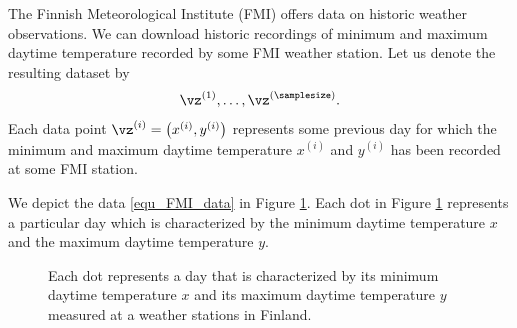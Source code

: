 \documentclass[12pt]{report}
\begin{document}
The Finnish Meteorological Institute (FMI) offers data on historic weather 
observations. We can download historic recordings of minimum and 
maximum daytime temperature recorded by some FMI weather station. 
Let us denote the resulting dataset by 
\begin{equation}
\label{equ_FMI_data}
\vz^{(1)},\ldots,\vz^{(\samplesize)}.  
\end{equation} 
Each data point $\vz^{(i)} = \big(x^{(i)},y^{(i)}\big)$ represents some previous day 
for which the minimum and maximum daytime temperature $x^{(i)}$ and $y^{(i)}$ 
has been recorded at some FMI station.  %

We depict the data \eqref{equ_FMI_data} in Figure \ref{fig_scatterplot_temp_FMI}.  
Each dot in Figure \ref{fig_scatterplot_temp_FMI} represents a 
particular day which is characterized by the minimum daytime 
temperature $x$ and the maximum daytime temperature $y$. 

\begin{figure}[htbp]
	\begin{center}
		\vspace*{-14mm}
	\end{center}
	\caption{Each dot represents a day that is characterized 
		by its minimum daytime temperature $x$ and its maximum 
		daytime temperature $y$ measured at a weather stations in Finland.}
	\label{fig_scatterplot_temp_FMI}
	\vspace*{-3mm}
\end{figure}
\end{document}
